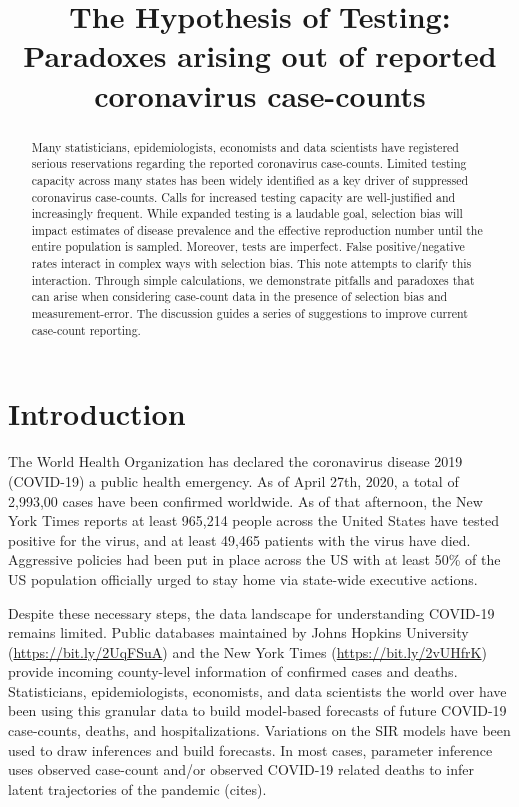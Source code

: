 \documentclass[11pt]{article}
\numberwithin{equation}{section}
\theoremstyle{plain}
\begin{document}
\title{The Hypothesis of Testing: Paradoxes arising out of reported coronavirus case-counts}
\maketitle

\begin{abstract}
Many statisticians, epidemiologists, economists and data scientists have registered serious reservations regarding the reported coronavirus case-counts. Limited testing capacity across many states has been widely identified as a key driver of suppressed coronavirus case-counts.  Calls for increased testing capacity are well-justified and increasingly frequent.  While expanded testing is a laudable goal, selection bias will impact estimates of disease prevalence and the effective reproduction number until the entire population is sampled.  Moreover, tests are imperfect.  False positive/negative rates interact in complex ways with selection bias.  This note attempts to clarify this interaction.  Through simple calculations, we demonstrate pitfalls and paradoxes that can arise when considering case-count data in the presence of selection bias and measurement-error. The discussion guides a series of suggestions to improve current case-count reporting.
\end{abstract}

\section{Introduction}
The World Health Organization has declared the coronavirus disease 2019 (COVID-19) a public health emergency.  As of April 27th, 2020, a total of 2,993,00 cases have been confirmed worldwide.  As of that afternoon, the New York Times reports at least 965,214 people across the United States have tested positive for the virus, and at least 49,465 patients with the virus have died.  Aggressive policies had been put in place across the US with at least 50\% of the US population officially urged to stay home via state-wide executive actions.

Despite these necessary steps, the data landscape for understanding COVID-19 remains limited.  Public databases maintained by Johns Hopkins University (\url{https://bit.ly/2UqFSuA}) and the New York Times (\url{https://bit.ly/2vUHfrK}) provide incoming county-level information of confirmed cases and deaths.  Statisticians, epidemiologists, economists, and data scientists the world over have been using this granular data to build model-based forecasts of future COVID-19 case-counts, deaths, and hospitalizations.  Variations on the SIR models have been used to draw inferences and build forecasts.  In most cases, parameter inference uses observed case-count and/or observed COVID-19 related deaths to infer latent trajectories of the pandemic (cites).
\end{document}
